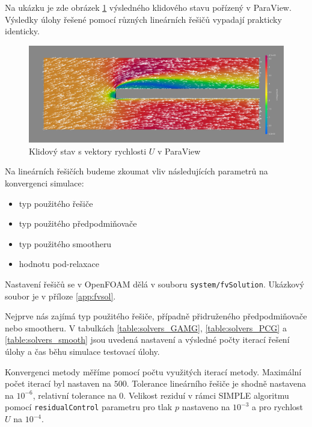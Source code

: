 \documentclass[a4paper,12pt]{report}
\theoremstyle{remark}
\begin{document}
	
Na ukázku je zde obrázek \ref{fig:pv-GAMG-GS} výsledného klidového stavu pořízený v ParaView. Výsledky úlohy řešené pomocí různých lineárních řešičů vypadají prakticky identicky.
	
	 \begin{figure}[H]
		\centering
		\includegraphics[width=1\linewidth]{pv-GAMG-GS.png}
		\caption{Klidový stav s vektory rychlosti $U$ v ParaView}
		\label{fig:pv-GAMG-GS}
	\end{figure}


Na lineárních řešičích budeme zkoumat vliv následujících parametrů na konvergenci simulace:
 
\begin{itemize}
	\item typ použitého řešiče
	\item typ použitého předpodmiňovače
	\item typ použitého smootheru
	\item hodnotu pod-relaxace
\end{itemize}

Nastavení řešičů se v OpenFOAM dělá v souboru \texttt{system/fvSolution}. Ukázkový soubor je v příloze \ref{app:fvsol}.
	
 Nejprve nás zajímá typ použitého řešiče, případně přidruženého předpodmiňovače nebo smootheru. V tabulkách \ref{table:solvers_GAMG}, \ref{table:solvers_PCG} a \ref{table:solvers_smooth} jsou uvedená nastavení a výsledné počty iterací řešení úlohy a čas běhu simulace testovací úlohy.
 
 Konvergenci metody měříme pomocí počtu využitých iterací metody. Maximální počet iterací byl nastaven na $500$. Tolerance lineárního řešiče je shodně nastavena na $10^{-6}$, relativní tolerance na $0$. Velikost reziduí v rámci SIMPLE algoritmu pomocí \texttt{residualControl} parametru pro tlak $p$ nastaveno na $10^{-3}$ a pro rychlost $U$ na $10^{-4}$.
\end{document}
